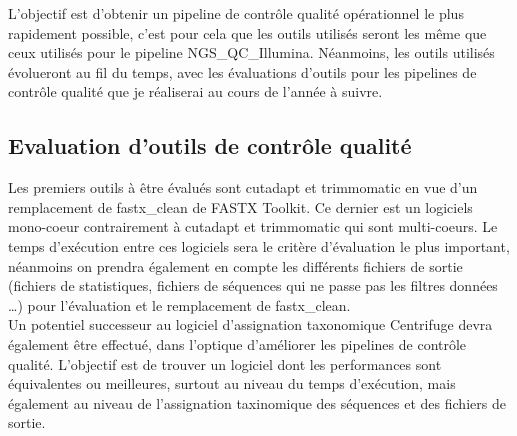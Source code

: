 L'objectif est d'obtenir un pipeline de contrôle qualité opérationnel le plus rapidement possible, c'est pour cela que les outils utilisés seront les même que ceux utilisés pour le pipeline NGS\_QC\_Illumina. Néanmoins, les outils utilisés évolueront au fil du temps, avec les évaluations d'outils pour les pipelines de contrôle qualité que je réaliserai au cours de l'année à suivre.

\subsection{Evaluation d'outils de contrôle qualité}
Les premiers outils à être évalués sont cutadapt et trimmomatic en vue d'un remplacement de fastx\_clean de FASTX Toolkit. Ce dernier est un logiciels mono-coeur contrairement à cutadapt et trimmomatic qui sont multi-coeurs. Le temps d'exécution entre ces logiciels sera le critère d'évaluation le plus important, néanmoins on prendra également en compte les différents fichiers de sortie (fichiers de statistiques, fichiers de séquences qui ne passe pas les filtres données \dots) pour l'évaluation et le remplacement de fastx\_clean.\\

Un potentiel successeur au logiciel d'assignation taxonomique Centrifuge devra également être effectué, dans l'optique d'améliorer les pipelines de contrôle qualité. L'objectif est de trouver un logiciel dont les performances sont équivalentes ou meilleures, surtout au niveau du temps d'exécution, mais également au niveau de l'assignation taxinomique des séquences et des fichiers de sortie.